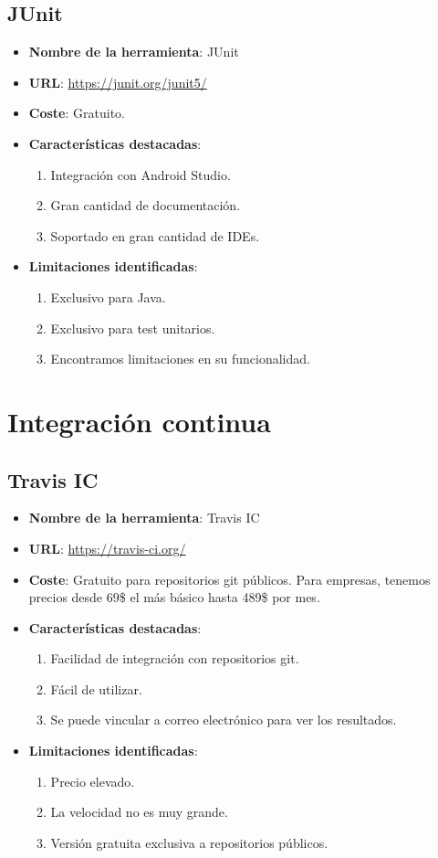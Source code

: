 \subsection{JUnit}

\begin{itemize}
	\item \textbf{Nombre de la herramienta}: JUnit
	\item \textbf{URL}: \url{https://junit.org/junit5/}
	\item \textbf{Coste}: Gratuito.
	\item \textbf{Características destacadas}:
	\begin{enumerate}
		\item Integración con Android Studio.
		\item Gran cantidad de documentación.
		\item Soportado en gran cantidad de IDEs.
	\end{enumerate}
	\item \textbf{Limitaciones identificadas}:
	\begin{enumerate}
		\item Exclusivo para Java.
		\item Exclusivo para test unitarios.
		\item Encontramos limitaciones en su funcionalidad.
	\end{enumerate}
\end{itemize}

\section{Integración continua}

\subsection{Travis IC}

\begin{itemize}
	\item \textbf{Nombre de la herramienta}: Travis IC
	\item \textbf{URL}: \url{https://travis-ci.org/}
	\item \textbf{Coste}: Gratuito para repositorios git públicos. Para empresas, tenemos precios desde 69\$ el más básico hasta 489\$ por mes.	
	\item \textbf{Características destacadas}:
	\begin{enumerate}
		\item Facilidad de integración con repositorios git.
		\item Fácil de utilizar.
		\item Se puede vincular a correo electrónico para ver los resultados.
	\end{enumerate}
	\item \textbf{Limitaciones identificadas}:
	\begin{enumerate}
		\item Precio elevado.
		\item La velocidad no es muy grande.
		\item Versión gratuita exclusiva a repositorios públicos.
	\end{enumerate}
\end{itemize}

